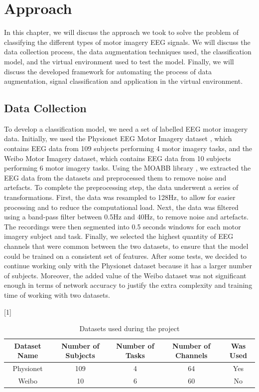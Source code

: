 \chapter{Approach}\label{ch:approach}
In this chapter, we will discuss the approach we took to solve the problem of classifying the different types of motor imagery EEG signals.
We will discuss the data collection process, the data augmentation techniques used, the classification model, and the virtual environment used to test the model. 
Finally, we will discuss the developed framework for automating the process of data augmentation, signal classification and application in the virtual environment.

\section{Data Collection}
To develop a classification model, we need a set of labelled EEG motor imagery data.
Initially, we used the Physionet EEG Motor Imagery dataset \cite{goldberger2000physiobank}, which contains EEG data from 109 subjects performing 4 motor imagery tasks, and the Weibo Motor Imagery \cite{yi2014evaluation} dataset, which contains EEG data from 10 subjects performing 6 motor imagery tasks.
Using the MOABB library \cite{Aristimunha_Mother_of_all_2023, chevallier2024largest, jayaram2018moabb}, we extracted the EEG data from the datasets and preprocessed them to remove noise and artefacts.
To complete the preprocessing step, the data underwent a series of transformations.
First, the data was resampled to 128Hz, to allow for easier processing and to reduce the computational load.
Next, the data was filtered using a band-pass filter between 0.5Hz and 40Hz, to remove noise and artefacts.
The recordings were then segmented into 0.5 seconds windows for each motor imagery subject and task.
Finally, we selected the highest quantity of EEG channels that were common between the two datasets, to ensure that the model could be trained on a consistent set of features.
After some tests, we decided to continue working only with the Physionet dataset because it has a larger number of subjects.
Moreover, the added value of the Weibo dataset was not significant enough in terms of network accuracy to justify the extra complexity and training time of working with two datasets.
\begin{table}[!htbp]
    \centering
    \scalebox{.8}[1]{
    \begin{tabular}{|c|c|c|c||c|}
        \hline
        \textbf{Dataset Name} & \textbf{Number of Subjects} & \textbf{Number of Tasks} & \textbf{Number of Channels} & \textbf{Was Used}\\
        \hline
        \hline
        Physionet & 109 & 4 & 64 & Yes\\
        \hline
        Weibo & 10 & 6 & 60 & No\\
        \hline
    \end{tabular}
    }
    \caption{Datasets used during the project}
    \label{tab:datasamples}
\end{table}

